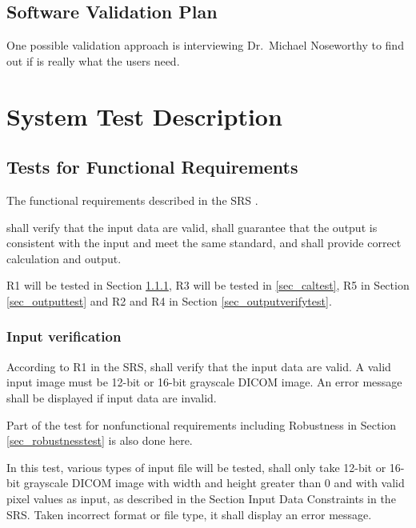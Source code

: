 \documentclass[12pt, titlepage]{article}
\begin{document}
\subsection{Software Validation Plan}

One possible validation approach is interviewing Dr.\ Michael Noseworthy to
find out if \progname{} is really what the users need.

\section{System Test Description} \label{sec_systestdescri}

\subsection{Tests for Functional Requirements} \label{sec_funcreqtest}

The functional requirements described in the SRS \cite{Dong2019SRS}. 

\progname{} shall verify that the input data are valid, shall guarantee that
the output is consistent with the input and meet the same standard, and shall
provide correct calculation and output.

R1 will be tested in Section \ref{sec_inputtest}, R3 will be tested in
\ref{sec_caltest}, R5 in Section \ref{sec_outputtest} and R2 and R4 in Section
\ref{sec_outputverifytest}.

\subsubsection{Input verification}
\label{sec_inputtest}

According to R1 in the SRS, \progname{} shall verify that the input data are
valid. A valid input image must be 12-bit or 16-bit grayscale DICOM image. An
error message shall be displayed if input data are invalid.

Part of the test for nonfunctional requirements including Robustness in Section
\ref{sec_robustnesstest} is also done here.

In this test, various types of input file will be tested, \progname{} shall
only take 12-bit or 16-bit grayscale DICOM image with width and height greater
than 0
and with valid pixel values as input, as described in the Section Input Data
Constraints in the SRS. Taken incorrect format or
file type, it shall display an error message.
		
\end{document}
